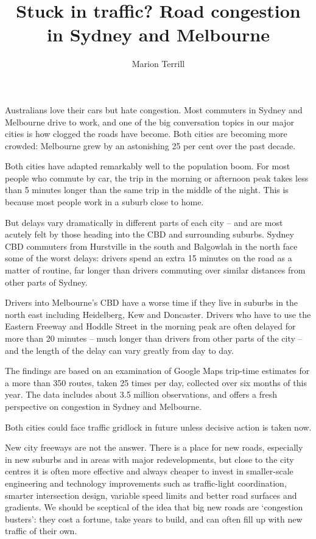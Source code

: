 \documentclass{grattan}
\author{Marion Terrill}
\title{Stuck in traffic? Road congestion in Sydney and Melbourne}
\begin{document}
\begin{overview}

Australians love their cars but hate congestion. Most commuters in Sydney and Melbourne drive to work, and one of the big conversation topics in our major cities is how clogged the roads have become. Both cities are becoming more crowded: Melbourne grew by an astonishing 25 per cent over the past decade.

Both cities have adapted remarkably well to the population boom. For most people who commute by car, the trip in the morning or afternoon peak takes less than 5 minutes longer than the same trip in the middle of the night. This is because most people work in a suburb close to home.

But delays vary dramatically in different parts of each city -- and are most acutely felt by those heading into the CBD and surrounding suburbs. Sydney CBD commuters from Hurstville in the south and Balgowlah in the north face some of the worst delays: drivers spend an extra 15 minutes on the road as a matter of routine, far longer than drivers commuting over similar distances from other parts of Sydney.

Drivers into Melbourne's CBD have a worse time if they live in suburbs in the north east including Heidelberg, Kew and Doncaster. Drivers who have to use the Eastern Freeway and Hoddle Street in the morning peak are often delayed for more than 20 minutes -- much longer than drivers from other parts of the city -- and the length of the delay can vary greatly from day to day.

The findings are based on an examination of Google Maps trip-time estimates for a more than 350 routes, taken 25 times per day, collected over six months of this year. The data includes about 3.5 million observations, and offers a fresh perspective on congestion in Sydney and Melbourne.

Both cities could face traffic gridlock in future unless decisive action is taken now.

New city freeways are not the answer. There is a place for new roads, especially in new suburbs and in areas with major redevelopments, but close to the city centres it is often more effective and always cheaper to invest in smaller-scale engineering and technology improvements such as traffic-light coordination, smarter intersection design, variable speed limits and better road surfaces and gradients. We should be sceptical of the idea that big new roads are ‘congestion busters’: they cost a fortune, take years to build, and can often fill up with new traffic of their own.


\end{overview}
\end{document}
